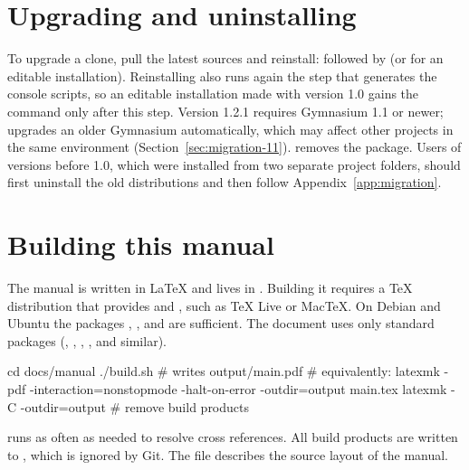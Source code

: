 \section{Upgrading and uninstalling}\label{sec:install-upgrade}

To upgrade a clone, pull the latest sources and reinstall:
 followed by  (or
 for an editable installation).
Reinstalling also runs again the step that generates the console scripts, so
an editable installation made with version 1.0 gains the 
command only after this step. Version 1.2.1 requires Gymnasium 1.1 or newer;
 upgrades an older Gymnasium automatically, which may affect other
projects in the same environment (Section~\ref{sec:migration-11}).
 removes the package. Users of versions before
1.0, which were installed from two separate project folders, should first
uninstall the old distributions and then follow Appendix~\ref{app:migration}.

\section{Building this manual}\label{sec:install-manual}

The manual is written in LaTeX and lives in . Building it
requires a TeX distribution that provides  and ,
such as TeX Live or MacTeX. On Debian and Ubuntu the packages
, , 
and  are sufficient. The
document uses only standard packages (, ,
, ,  and similar).

\begin{shellcode}
cd docs/manual
./build.sh                                   # writes output/main.pdf
# equivalently:
latexmk -pdf -interaction=nonstopmode -halt-on-error -outdir=output main.tex
latexmk -C -outdir=output                    # remove build products
\end{shellcode}

 runs  as often as needed to resolve cross
references. All build products are written to ,
which is ignored by Git. The file  describes the
source layout of the manual.

\par\endgroup
